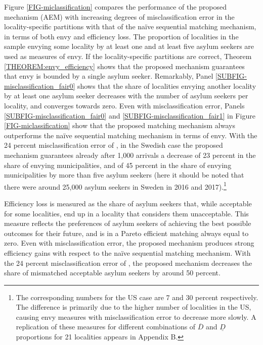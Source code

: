 \documentclass[12pt,fleqn]{article}
\begin{document}
Figure \ref{FIG-miclassification} compares the performance of the proposed mechanism (AEM) with increasing degrees of misclassification error in the locality-specific partitions with that of the na\"{i}ve sequential matching mechanism, in terms of both envy and efficiency loss. The proportion of localities in the sample envying some locality by at least one and at least five asylum seekers are used as measures of envy. If the locality-specific partitions are correct, Theorem \ref{THEOREM:envy_efficiency} shows that the proposed mechanism guarantees that envy is bounded by a single asylum seeker. Remarkably, Panel \ref{SUBFIG-misclassification_fair0} shows that the share of localities envying another locality by at least one asylum seeker decreases with the number of asylum seekers per locality, and converges towards zero. Even with misclassification error, Panels \ref{SUBFIG-misclassification_fair0} and \ref{SUBFIG-misclassification_fair1} in Figure \ref{FIG-miclassification} show that the proposed matching mechanism always outperforms the na\"{i}ve sequential matching mechanism in terms of envy. With the 24 percent misclassification error of \cite{bib:BansakEtAl}, in the Swedish case the proposed mechanism guarantees already after 1,000 arrivals a decrease of 23 percent in the share of envying municipalities, and of 45 percent in the share of envying municipalities by more than five asylum seekers (here it should be noted that there were around 25,000 asylum seekers in Sweden in 2016 and 2017).\footnote{The corresponding numbers for the US case are 7 and 30 percent respectively. The difference is primarily due to the higher number of localities in the US, causing envy measures with misclassification error to decrease more slowly. A replication of these measures for different combinations of $\overline{D}$ and $\underline{D}$ proportions for 21 localities appears in Appendix B.}

Efficiency loss is measured as the share of asylum seekers that, while acceptable for some localities, end up in a locality that considers them unacceptable. This measure reflects the preferences of asylum seekers of achieving the best possible outcomes for their future, and is in a Pareto efficient matching always equal to zero. Even with misclassification error, the proposed mechanism produces strong efficiency gains with respect to the na\"{i}ve sequential matching mechanism. With the 24 percent misclassification error of \cite{bib:BansakEtAl}, the proposed mechanism decreases the share of mismatched acceptable asylum seekers by around 50 percent.
\end{document}
